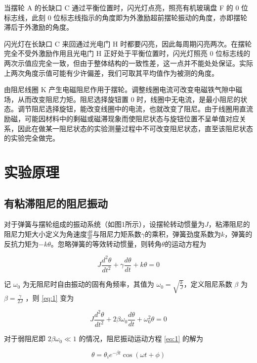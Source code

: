 \documentclass[12pt,a4paper]{amsart}
\begin{document}
当摆轮 A 的长缺口 C 通过平衡位置时，闪光灯点亮，照亮有机玻璃盘 F 的 0 位标志线，此刻 0 位标志线指示的角度即为外激励超前摆轮振动的角度，亦即摆轮滞后于外激励的角度。

闪光灯在长缺口 C 来回通过光电门 H 时都要闪亮，因此每周期闪亮两次。在摆轮完全不受外激励作用且光电门 H 正好处于平衡位置时，闪光灯照亮 0 位标志线的两次示值应完全一致，但由于整体结构的一致性差，这一点并不能处处保证。实际上两次角度示值可能有少许偏差，我们可取其平均值作为被测的角度。

由阻尼线圈 K 产生电磁阻尼作用于摆轮。调整线圈电流可改变电磁铁气隙中磁场，从而改变阻尼力矩。阻尼选择旋钮置 0 时，线圈中无电流，是最小阻尼的状态。调节阻尼选择旋钮，能改变线圈中的电流，也就改变了阻尼。由于线圈用直流励磁，可能因材料中的剩磁或磁滞现象而使阻尼状态与旋钮位置不呈单值对应关系，因此在做某一阻尼状态的实验测量过程中不可改变阻尼状态，直至该阻尼状态的实验完全做完。

\section{实验原理}

\subsection{有粘滞阻尼的阻尼振动}

对于弹簧与摆轮组成的振动系统（如图1所示），设摆轮转动惯量为$J$，粘滞阻尼的阻尼力矩大小定义为角速度$\frac{d\theta}{dt}$与阻尼力矩系数$\gamma$的乘积，弹簧劲度系数为$k$，弹簧的反抗力矩为$-k\theta$。忽略弹簧的等效转动惯量，则转角$\theta$的运动方程为

\begin{equation}
    J\frac{d^2\theta}{dt^2} + \gamma\frac{d\theta}{dt} + k\theta = 0 \label{eq:1}
\end{equation}

记 $\omega_0$ 为无阻尼时自由振动的固有角频率，其值为 $\omega_0 = \sqrt{\frac{k}{J}}$，定义阻尼系数 $\beta$ 为 $\beta = \frac{\gamma}{2J}$ ，则 \ref{eq:1} 变为

\begin{equation}
    J\frac{d^2\theta}{dt^2} + 2\beta\omega_0\frac{d\theta}{dt} + \omega_0^2\theta = 0 \label{eq:2}
\end{equation}

对于弱阻尼即 $2\beta\omega_0 \ll 1$ 的情况，阻尼振动运动方程 \ref{eq:1} 的解为

\begin{equation}
    \theta = \theta_i e^{-\beta t}\cos(\omega t + \phi) \label{eq:3}
\end{equation}
\end{document}
